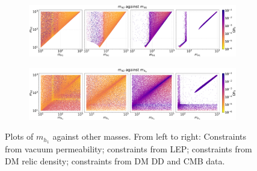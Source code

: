 \documentclass[12pt]{article}
\begin{document}
\begin{figure}[H]
    \begin{subfigure}[b]{\columnwidth}
      \centering
      \includegraphics[width=1\columnwidth]{4plot/MD2_MD1.pdf}
    \end{subfigure}

    \begin{subfigure}[b]{\columnwidth}
      \centering
      \includegraphics[width=1\columnwidth]{4plot/MD2_MDP.pdf}
    \end{subfigure}
    \caption{Plots of $m_{h_1}$ against other masses. From left to right: Constraints from vacuum permeability; constraints from LEP; constraints from DM relic density; constraints from DM DD and CMB data.}
\end{figure}
\end{document}
